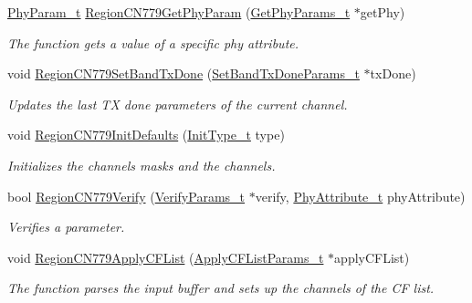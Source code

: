 \begin{DoxyCompactItemize}
\item 
\hyperlink{group__REGION_gaed159b26e5c4677236b6e8677019db30}{Phy\+Param\+\_\+t} \hyperlink{group__REGIONCN779_gab45c9a48b25622ab197ab8510cc7cbc0}{Region\+C\+N779\+Get\+Phy\+Param} (\hyperlink{group__REGION_gab471483fff904f4f89bbc03f7fc380ab}{Get\+Phy\+Params\+\_\+t} $\ast$get\+Phy)
\begin{DoxyCompactList}\small\item\em The function gets a value of a specific phy attribute. \end{DoxyCompactList}\item 
void \hyperlink{group__REGIONCN779_gab7e1485f1112861ad7dae9801995a2c4}{Region\+C\+N779\+Set\+Band\+Tx\+Done} (\hyperlink{group__REGION_gad0524aa0673c0814a71e7a4f9cade3fc}{Set\+Band\+Tx\+Done\+Params\+\_\+t} $\ast$tx\+Done)
\begin{DoxyCompactList}\small\item\em Updates the last TX done parameters of the current channel. \end{DoxyCompactList}\item 
void \hyperlink{group__REGIONCN779_ga85953f37b52567b54689c354671a14f6}{Region\+C\+N779\+Init\+Defaults} (\hyperlink{group__REGION_gaddc73ae10673ec925724e7870363bda9}{Init\+Type\+\_\+t} type)
\begin{DoxyCompactList}\small\item\em Initializes the channels masks and the channels. \end{DoxyCompactList}\item 
bool \hyperlink{group__REGIONCN779_ga7108626b64685883842049a36d865208}{Region\+C\+N779\+Verify} (\hyperlink{group__REGION_ga966d97bc2f25df1c09e92e60ef652276}{Verify\+Params\+\_\+t} $\ast$verify, \hyperlink{group__REGION_ga9445b07fdf77581ecfaf389970e635f8}{Phy\+Attribute\+\_\+t} phy\+Attribute)
\begin{DoxyCompactList}\small\item\em Verifies a parameter. \end{DoxyCompactList}\item 
void \hyperlink{group__REGIONCN779_ga7f02e6a802649d9b93c4c56eff271a26}{Region\+C\+N779\+Apply\+C\+F\+List} (\hyperlink{group__REGION_ga71588e9ad07e34b78fa91d51881fd3c6}{Apply\+C\+F\+List\+Params\+\_\+t} $\ast$apply\+C\+F\+List)
\begin{DoxyCompactList}\small\item\em The function parses the input buffer and sets up the channels of the CF list. \end{DoxyCompactList}\item 

\end{DoxyCompactItemize}
